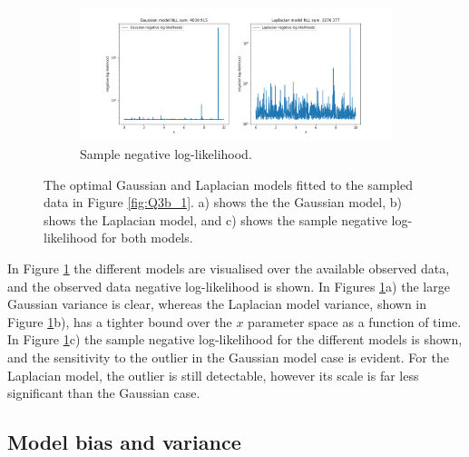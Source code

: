 \documentclass{article}
\begin{document}
\begin{figure}[!htb]
     \begin{subfigure}[b]{0.8\textwidth}
         \centering
         \includegraphics[width=\textwidth]{Q3b_fig8.png}
         \caption{Sample negative log-likelihood.}
     \end{subfigure}
        \caption{The optimal Gaussian and Laplacian models fitted to the sampled data in Figure \ref{fig:Q3b_1}. a) shows the the Gaussian model, b) shows the Laplacian model, and c) shows the sample negative log-likelihood for both models.}
        \label{fig:Q3b_2}
\end{figure}

In Figure \ref{fig:Q3b_2} the different models are visualised over the available observed data, and the observed data negative log-likelihood is shown. In Figures \ref{fig:Q3b_2}a) the large Gaussian variance is clear, whereas the Laplacian model variance, shown in Figure \ref{fig:Q3b_2}b), has a tighter bound over the $x$ parameter space as a function of time. In Figure \ref{fig:Q3b_2}c) the sample negative log-likelihood for the different models is shown, and the sensitivity to the outlier in the Gaussian model case is evident. For the Laplacian model, the outlier is still detectable, however its scale is far less significant than the Gaussian case.

\subsection{Model bias and variance}
\end{document}
